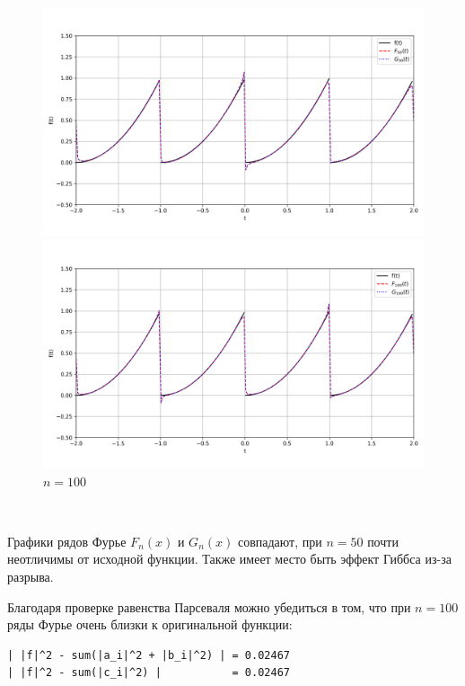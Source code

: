 \documentclass[a4paper]{article}
\begin{document}
\begin{figure}[H]
    \begin{minipage}{0.5\textwidth}
        \centering \includegraphics[width=\textwidth]{periodic_func/50.png}
        \caption{$n = 50$}
    \end{minipage}\hfill
    \begin{minipage}{0.5\textwidth}
        \centering \includegraphics[width=\textwidth]{periodic_func/100.png}
        \caption{$n = 100$}
    \end{minipage}
\end{figure}\noindent\

Графики рядов Фурье $F_n(x)$ и $G_n(x)$ совпадают, при $n = 50$ почти неотличимы от исходной функции. Также имеет место быть эффект Гиббса из-за разрыва.

Благодаря проверке равенства Парсеваля можно убедиться в том, что при $n=100$ ряды Фурье очень близки к оригинальной функции:\\

\begin{lstlisting}[caption={Равенство Парсеваля при $n=100$}, numbers=none]
| |f|^2 - sum(|a_i|^2 + |b_i|^2) | = 0.02467
| |f|^2 - sum(|c_i|^2) |           = 0.02467
\end{lstlisting}
\end{document}
